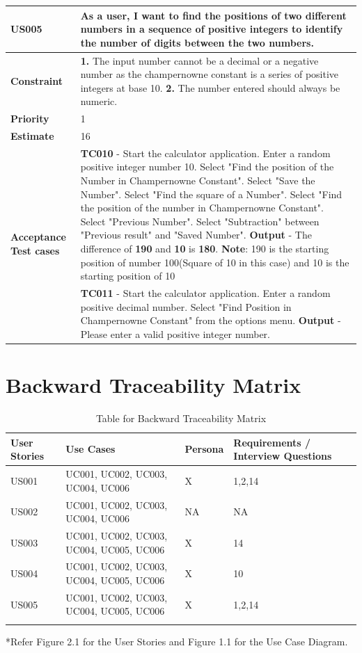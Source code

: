 \documentclass[12pt, a4paper]{report}
\begin{document}
\begin{tabular}{|p{3cm}|p{12cm}|}
\hline
     \textbf{US005} &  As a user, I want to find the positions of two different numbers in a sequence of positive integers to identify the number of digits between the two numbers.\\\hline
     \textbf{Constraint} &  \textbf{1. } The input number cannot be a decimal or a negative number as the champernowne constant is a series of positive integers at base 10. \newline \textbf{2. } The number entered should always be numeric.\\\hline
     \textbf{Priority} & 1 \\\hline
     \textbf{Estimate} & 16 \\\hline
     \multirow{2}{3cm}{\textbf{Acceptance Test cases}} & \textbf{TC010} - Start the calculator application. Enter a random positive integer number 10. Select "Find the position of the Number in Champernowne Constant". Select "Save the Number". Select "Find the square of a Number". Select "Find the position of the number in Champernowne Constant". Select "Previous Number". Select "Subtraction" between "Previous result" and  "Saved Number". \newline \textbf{Output} - The difference of \textbf{190} and \textbf{10} is \textbf{180}. \newline \textbf{Note}: 190 is the starting position of number 100(Square of 10 in this case) and 10 is the starting position of 10  \\\cline{2-2}
     & \textbf{TC011} - Start the calculator application. Enter a random positive decimal number. Select "Find Position in Champernowne Constant" from the options menu. \newline \textbf{Output} - Please enter a valid positive integer number.\\\hline
\end{tabular} 

\chapter {Backward Traceability Matrix}

\begin{longtable}{|p{1.5cm}|p{3cm}|p{2cm}|p{4cm}|}

    \hline
    User Stories & Use Cases & Persona & Requirements / Interview Questions \\\hline
    US001 & UC001, UC002, UC003, UC004, UC006 & X & 1,2,14\\\hline
    US002 & UC001, UC002, UC003, UC004, UC006 &NA &NA\\\hline
    US003 & UC001, UC002, UC003, UC004, UC005, UC006 & X & 14\\\hline
    US004 & UC001, UC002, UC003, UC004, UC005, UC006 & X & 10\\\hline
    US005 & UC001, UC002, UC003, UC004, UC005, UC006 & X & 1,2,14\\\hline
\caption{Table for Backward Traceability Matrix}
\label{table:1}
\end{longtable}
{*Refer Figure 2.1 for the User Stories and Figure 1.1 for the Use Case Diagram.}
\\
\end{document}
